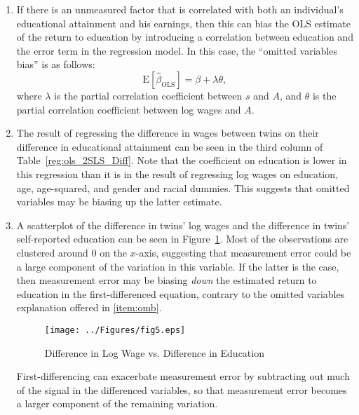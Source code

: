 \documentclass{article}
\begin{document}
\begin{enumerate}
\begin{enumerate}
\item If there is an unmeasured factor that is correlated with both an individual's educational attainment and his earnings, then this can bias the OLS estimate of the return to education by introducing a correlation between education and the error term in the regression model. In this case, the ``omitted variables bias'' is as follows:
\begin{equation}\text{E}\left[\hat{\beta}_{\text{OLS}}\right]=\beta+\lambda\theta,\end{equation}
where $\lambda$ is the partial correlation coefficient between $s$ and $A$, and $\theta$ is the partial correlation coefficient between log wages and $A$.

\item \label{item:omb} The result of regressing the difference in wages between twins on their difference in educational attainment can be seen in the third column of Table~\ref{reg:ols_2SLS_Diff}. Note that the coefficient on education is lower in this regression than it is in the result of regressing log wages on education, age, age-squared, and gender and racial dummies. This suggests that omitted variables may be biasing up the latter estimate.

\item A scatterplot of the difference in twins' log wages and the difference in twins' self-reported education can be seen in Figure~\ref{fig:dlw_ded}. Most of the observations are clustered around $0$ on the $x$-axis, suggesting that measurement error could be a large component of the variation in this variable.  If the latter is the case, then measurement error may be biasing \emph{down} the estimated return to education in the first-differenced equation, contrary to the omitted variables explanation offered in \ref{item:omb}.

\begin{figure}[htbp!]
\centering
\texttt{[image: ../Figures/fig5.eps]}
\caption{Difference in Log Wage vs. Difference in Education}
\label{fig:dlw_ded}
\end{figure}

First-differencing can exacerbate measurement error by subtracting out much of the signal in the differenced variables, so that measurement error becomes a larger component of the remaining variation.


\end{enumerate}
\end{enumerate}
\end{document}
